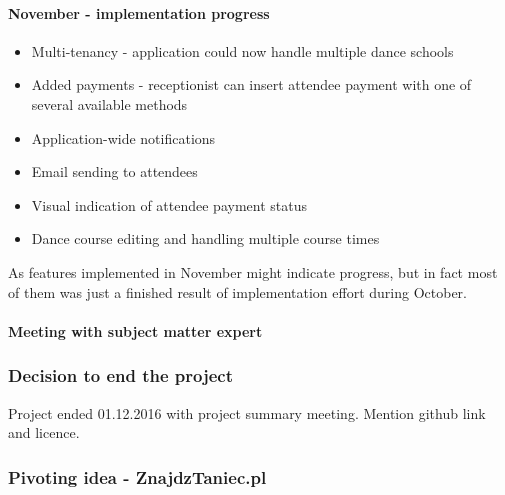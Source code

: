 \documentclass{article}
\begin{document}
\paragraph{November - implementation progress}
\begin{itemize}
\item Multi-tenancy - application could now handle multiple dance schools 
\item Added payments - receptionist can insert attendee payment with one of several available methods
\item Application-wide notifications
\item Email sending to attendees
\item Visual indication of attendee payment status
\item Dance course editing and handling multiple course times
\end{itemize}
As features implemented in November might indicate progress, but in fact most of them was just a finished result of implementation effort during October.

\paragraph{Meeting with subject matter expert}

\subsubsection{Decision to end the project}
Project ended 01.12.2016 with project summary meeting. Mention github link and licence.

\subsubsection{Pivoting idea - ZnajdzTaniec.pl}

\newpage
\end{document}
